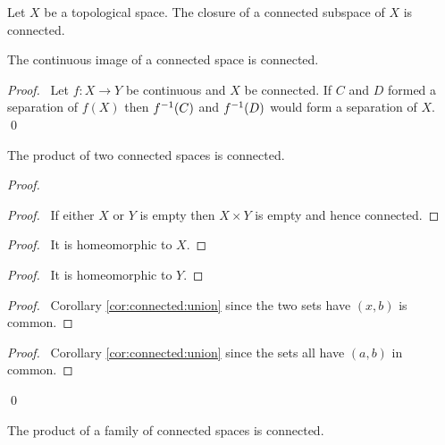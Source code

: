 \begin{cor}
  \label{cor:connected:closure}
  Let $X$ be a topological space. The closure of a connected subspace of $X$ is connected.
\end{cor}

\begin{prop}
  \label{prop:connected:image}
  The continuous image of a connected space is connected.
\end{prop}

\begin{proof}
  \pf\ Let $f : X \rightarrow Y$ be continuous and $X$ be connected. If $C$ and $D$ formed a separation of $f(X)$ then ${f}^{-1}(C)$ and ${f}^{-1}(D)$ would form a separation of $X$. \qed
\end{proof}

\begin{prop}
  \label{prop:connected:binary_product}
  The product of two connected spaces is connected.
\end{prop}

\begin{proof}
  \pf
  \begin{proof}
    \pf\ If either $X$ or $Y$ is empty then $X \times Y$ is empty and hence connected.
  \end{proof}
  \begin{proof}
    \pf\ It is homeomorphic to $X$.
  \end{proof}
  \begin{proof}
    \pf\ It is homeomorphic to $Y$.
  \end{proof}
  \begin{proof}
    \pf\ Corollary \ref{cor:connected:union} since the two sets have $(x,b)$ is common.
  \end{proof}
  \begin{proof}
    \pf\ Corollary \ref{cor:connected:union} since the sets all have $(a,b)$ in common.
  \end{proof}
  \qed
\end{proof}

\begin{prop}
  The product of a family of connected spaces is connected.
\end{prop}

